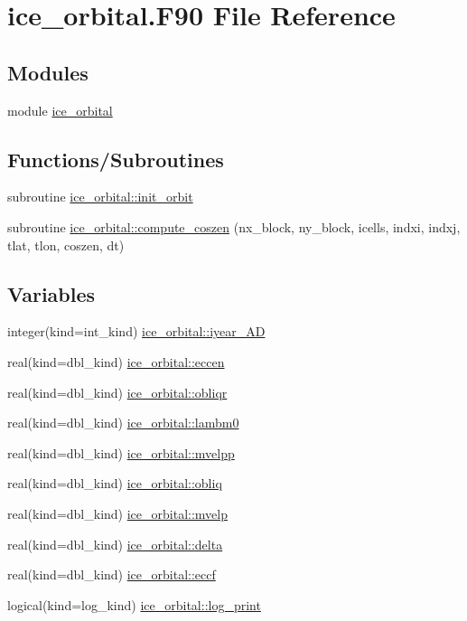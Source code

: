 \hypertarget{ice__orbital_8F90}{
\section{ice\_\-orbital.F90 File Reference}
\label{ice__orbital_8F90}
}
\subsection*{Modules}
\begin{DoxyCompactItemize}
\item 
module \hyperlink{namespaceice__orbital}{ice\_\-orbital}
\end{DoxyCompactItemize}
\subsection*{Functions/Subroutines}
\begin{DoxyCompactItemize}
\item 
subroutine \hyperlink{namespaceice__orbital_a2bb0fda98ea9e34715f91802df7c8e9c}{ice\_\-orbital::init\_\-orbit}
\item 
subroutine \hyperlink{namespaceice__orbital_a874f1fc41f0a366a196e53b9c8d13d85}{ice\_\-orbital::compute\_\-coszen} (nx\_\-block, ny\_\-block, icells, indxi, indxj, tlat, tlon, coszen, dt)
\end{DoxyCompactItemize}
\subsection*{Variables}
\begin{DoxyCompactItemize}
\item 
integer(kind=int\_\-kind) \hyperlink{namespaceice__orbital_adb48d087f6d15eae3b858c4347ae2da3}{ice\_\-orbital::iyear\_\-AD}
\item 
real(kind=dbl\_\-kind) \hyperlink{namespaceice__orbital_a24946bf121e343b1a874b8ca4f5cd700}{ice\_\-orbital::eccen}
\item 
real(kind=dbl\_\-kind) \hyperlink{namespaceice__orbital_a574192fd5a271f5addcbae852d673307}{ice\_\-orbital::obliqr}
\item 
real(kind=dbl\_\-kind) \hyperlink{namespaceice__orbital_aecd1e54c58dfa1c5f8c3c01250020047}{ice\_\-orbital::lambm0}
\item 
real(kind=dbl\_\-kind) \hyperlink{namespaceice__orbital_ac06fd0600b7af9337b89ab60e896d2a1}{ice\_\-orbital::mvelpp}
\item 
real(kind=dbl\_\-kind) \hyperlink{namespaceice__orbital_ab9294c89b23f79319e267acbe36054ae}{ice\_\-orbital::obliq}
\item 
real(kind=dbl\_\-kind) \hyperlink{namespaceice__orbital_a60cdda9eb0a01c43d7c74579bf173c35}{ice\_\-orbital::mvelp}
\item 
real(kind=dbl\_\-kind) \hyperlink{namespaceice__orbital_a2c094e1198e636bcaa1810e5730490a9}{ice\_\-orbital::delta}
\item 
real(kind=dbl\_\-kind) \hyperlink{namespaceice__orbital_a01d96908c345645e4dd439536e32eaba}{ice\_\-orbital::eccf}
\item 
logical(kind=log\_\-kind) \hyperlink{namespaceice__orbital_a1b10ff11977a2b2d6c6d830897a29597}{ice\_\-orbital::log\_\-print}
\end{DoxyCompactItemize}
